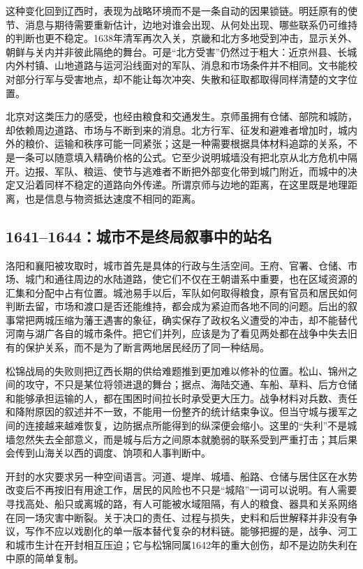 这种变化回到辽西时，表现为战略环境而不是一条自动的因果锁链。明廷原有的使节、消息与期待需要重新估计，边地对谁会出现、从何处出现、哪些联系仍可维持的判断也更不稳定。1638年清军再次入关，京畿和北方多地受到冲击，显示关外、朝鲜与关内并非彼此隔绝的舞台。可是“北方受害”仍然过于粗大：近京州县、长城内外村镇、山地道路与运河沿线面对的军队、消息和市场条件并不相同。文书能校对部分行军与受害地点，却不能让每次冲突、失散和征取都取得同样清楚的文字位置。

北京对这类压力的感受，也经由粮食和交通发生。京师虽拥有仓储、部院和城防，却依赖周边道路、市场与不断到来的消息。北方行军、征发和避难者增加时，城内外的粮价、运输和秩序可能一同紧张；这是一种需要根据具体材料追踪的关系，不是一条可以随意填入精确价格的公式。它至少说明城墙没有把北京从北方危机中隔开。边报、军队、粮运、使节与逃难者不断把外部变化带到城门附近，而城中的决定又沿着同样不稳定的道路向外传递。所谓京师与边地的距离，在这里既是地理距离，也是信息与物资抵达速度不相同的距离。

\subsection{1641--1644：城市不是终局叙事中的站名}

洛阳和襄阳被攻取时，城市首先是具体的行政与生活空间。王府、官署、仓储、市场、城门和通往周边的水陆道路，使它们不仅在王朝谱系中重要，也在区域资源的汇集和分配中占有位置。城池易手以后，军队如何取得粮食，原有官员和居民如何判断去留，市场和渡口是否还能维持，都会成为紧迫而各地不同的问题。后出的叙事常把两城压缩为藩王遇害的象征，确实保存了政权名义遭受的冲击，却不能替代河南与湖广各自的城市条件。把它们并列，应该是为了看见两处都在战争中失去旧有的保护关系，而不是为了断言两地居民经历了同一种结局。

松锦战局的失败则把辽西长期的供给难题推到更加难以修补的位置。松山、锦州之间的攻守，不只是某位将领进退的舞台；据点、海陆交通、车船、草料、后方仓储和能够承担运输的人，都在围困时间拉长时承受更大压力。战争材料对兵数、责任和降附原因的叙述并不一致，不能用一份整齐的统计结束争议。但当守城与援军之间的连接越来越难恢复，边防据点所能得到的纵深便会缩小。这里的“失利”不是城墙忽然失去全部意义，而是城与后方之间原本就脆弱的联系受到严重打击；其后果会传到山海关以西的调度、饷项和人事判断中。

开封的水灾要求另一种空间语言。河道、堤岸、城墙、船路、仓储与居住区在水势改变后不再按旧有用途工作，居民的风险也不只是“城陷”一词可以说明。有人需要寻找高处、船只或离城的路，有人可能被水域阻隔，有人的粮食、器具和关系网络在同一场灾害中断裂。关于决口的责任、过程与损失，史料和后世解释并非没有争议，写作不应以戏剧化的单一版本替代复杂的材料链。能够把握的是，战争、河工和城市生计在开封相互压迫；它与松锦同属1642年的重大创伤，却不是边防失利在中原的简单复制。

